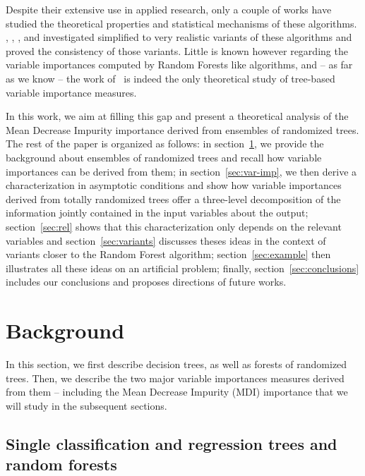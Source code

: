 \documentclass{article}
\begin{document}
Despite their extensive use in applied research, only a couple of works have
studied the theoretical properties and statistical mechanisms of these
algorithms. \citet{zhao2000new}, \citet{breiman2004consistency},
\citet{biau2008consistency,biau2012analysis}, \citet{meinshausen2006quantile}
and \citet{lin2006random} investigated simplified to very realistic variants of
these algorithms and proved  the consistency of those variants. Little is known
however regarding the variable importances computed by Random Forests like
algorithms, and -- as far as we know -- the work of~\citet{ishwaran2007variable}
is indeed the only theoretical study of tree-based variable importance measures.

In this work, we aim at filling this gap and present a theoretical  analysis of
the Mean Decrease Impurity importance derived from ensembles of randomized
trees. The rest of the paper is organized as follows: in
section~\ref{sec:background}, we provide  the background about ensembles of
randomized trees and recall how variable importances can be derived from them;
in section~\ref{sec:var-imp}, we then derive a characterization in asymptotic
conditions and show how variable importances derived from totally randomized
trees offer a three-level decomposition of the information jointly contained in
the input variables about the output; section~\ref{sec:rel} shows that this
characterization only depends on the relevant variables and
section~\ref{sec:variants} discusses theses ideas in the context of variants
closer to the Random Forest algorithm; section~\ref{sec:example} then
illustrates all these ideas on an artificial problem; finally,
section~\ref{sec:conclusions} includes our conclusions and proposes directions
of future works.




\section{Background}
\label{sec:background}

In this section, we first describe decision trees, as well as forests of
randomized trees. Then, we describe the two major variable importances measures
derived from them -- including the Mean Decrease Impurity (MDI) importance that we
will study in the subsequent sections.

\subsection{Single classification and regression trees and random forests}
\end{document}

